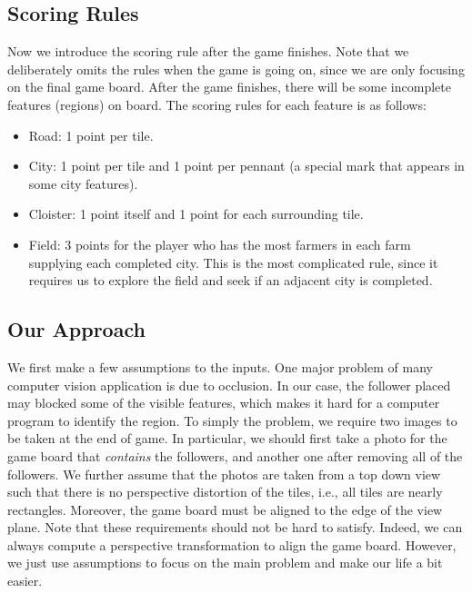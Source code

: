 \subsection{Scoring Rules}
Now we introduce the scoring rule after the game finishes.
Note that we deliberately omits the rules when the game is going on,
since we are only focusing on the final game board.
After the game finishes, there will be some incomplete features (regions)
on board. The scoring rules for each feature is as follows:
\begin{itemize}
  \item Road: 1 point per tile.
  \item City: 1 point per tile and 1 point per pennant (a special mark
    that appears in some city features).
  \item Cloister: 1 point itself and 1 point for each surrounding tile.
  \item Field: 3 points for the player who has the most farmers in each
    farm supplying each completed city. This is the most complicated rule,
    since it requires us to explore the field and seek if an adjacent city
    is completed.
\end{itemize}

\subsection{Our Approach}
We first make a few assumptions to the inputs.  One major problem of many
computer vision application is due to occlusion.  In our case, the follower
placed may blocked some of the visible features, which makes it hard for a
computer program to identify the region.  To simply the problem, we require two
images to be taken at the end of game.  In particular, we should first take a
photo for the game board that \emph{contains} the followers, and another one
after removing all of the followers. We further assume that the photos are
taken from a top down view such that there is no perspective distortion of the
tiles, i.e., all tiles are nearly rectangles. Moreover, the game board
must be aligned to the edge of the view plane. Note that these requirements
should not be hard to satisfy. Indeed, we can always compute a perspective
transformation to align the game board. However, we just use assumptions
to focus on the main problem and make our life a bit easier.

